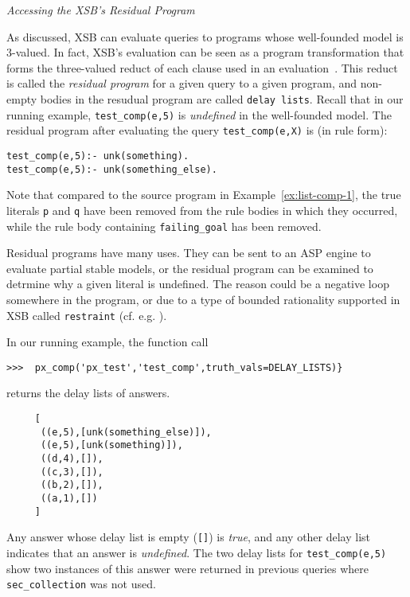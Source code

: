 \begin{example} \rm {\it Accessing the XSB's Residual Program} \label{ex:px-comp-undef}

As discussed, XSB can evaluate queries to programs whose well-founded
model is 3-valued.  In fact, XSB's evaluation can be seen as a program
transformation that forms the three-valued reduct of each clause used
in an evaluation~\cite{ChWa96}.  This reduct is called the {\em
  residual program} for a given query to a given program, and
non-empty bodies in the resudual program are called {\tt delay lists}.
Recall that in our running example, {\tt test\_comp(e,5)} is {\em
  undefined} in the well-founded model.  The residual program after
evaluating the query {\tt test\_comp(e,X)} is (in rule form):

\begin{verbatim}
test_comp(e,5):- unk(something).
test_comp(e,5):- unk(something_else).
\end{verbatim}

Note that compared to the source program in
Example~\ref{ex:list-comp-1}, the true literals {\tt p} and {\tt q}
have been removed from the rule bodies in which they occurred, while
the rule body containing {\tt failing\_goal} has been removed.

Residual programs have many uses.  They can be sent to an ASP engine
to evaluate partial stable models, or the residual program can be
examined to detrmine why a given literal is undefined. The reason
could be a negative loop somewhere in the program, or due to a type of
bounded rationality supported in XSB called {\tt restraint}
(cf. e.g. \cite{GroS13}).

In our running example, the function call

\begin{verbatim}  
>>>  px_comp('px_test','test_comp',truth_vals=DELAY_LISTS)}
\end{verbatim}

\noindent
returns the delay lists of answers.  

\begin{verbatim}
     [
      ((e,5),[unk(something_else)]),
      ((e,5),[unk(something)]),
      ((d,4),[]),
      ((c,3),[]),
      ((b,2),[]),
      ((a,1),[]) 
     ]
\end{verbatim}

Any answer whose delay list is empty ({\tt []}) is {\em true}, and any
other delay list indicates that an answer is {\em undefined}.  The two
delay lists for {\tt test\_comp(e,5)} show two instances of this
answer were returned in previous queries where {\tt sec\_collection}
was not used.
  \end{example}

